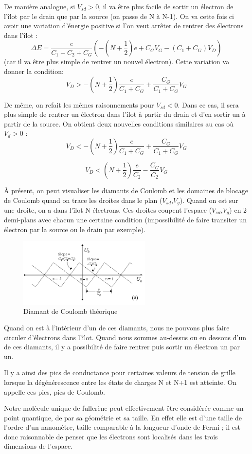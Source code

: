 De manière analogue, si $V_{sd}>0$, il va être plus facile de sortir un électron de l'îlot par le drain que par la source (on passe de N à N-1). On va cette fois ci avoir une variation d'énergie positive si l'on veut arrêter de rentrer des électrons dans l'îlot :
\[\Delta E = \frac{e}{C_1 + C_2 + C_G}\left(-(N + \frac{1}{2})e + C_G V_G - (C_1 + C_G) V_D\right)\]
(car il va être plus simple de rentrer un nouvel électron). Cette variation va donner la condition:
\[V_D > - (N + \frac{1}{2})\frac{e}{C_1 + C_G} + \frac{C_G}{C_1 + C_G}V_G\]

De même, on refait les mêmes raisonnements pour $V_{sd}<0$. Dans ce cas, il sera plus simple de rentrer un électron dans l'îlot à partir du drain et d'en sortir un à partir de la source. On obtient deux nouvelles conditions similaires au cas où  $V_{d}>0$ :
\[V_D < - (N + \frac{1}{2})\frac{e}{C_1 + C_G} + \frac{C_G}{C_1 + C_G}V_G\]

\[V_D < (N + \frac{1}{2})\frac{e}{C_2} - \frac{C_G}{C_2}V_G\]

À présent, on peut visualiser les diamants de Coulomb et les domaines de blocage de Coulomb quand on trace les droites dans le plan ($V_{sd}$,$V_{g}$). Quand on est sur une droite, on a dans l'îlot N électrons. Ces droites coupent l'espace ($V_{sd}$,$V_{g}$) en 2 demi-plans avec chacun une certaine condition (impossibilité de faire transiter un électron par la source ou le drain par exemple).
\begin{figure}[h]
    \begin{center}
        \includegraphics[width=250px]{Images/Diamant_Coulomb_Theorie.png}
        \caption{Diamant de Coulomb théorique}
        \label{fig:}
    \end{center}
\end{figure}

Quand on est à l'intérieur d'un de ces diamants, nous ne pouvons plus faire circuler d'électrons dans l'îlot. Quand nous sommes au-dessus ou en dessous d'un de ces diamants, il y a possibilité de faire rentrer puis sortir un électron un par un.

Il y a ainsi des pics de conductance pour certaines valeurs de tension de grille lorsque la dégénérescence entre les états de charges N et N+1 est atteinte. On appelle ces pics, pics de Coulomb.

Notre molécule unique de fullerène peut effectivement être considérée comme un point quantique, de par sa géométrie et sa taille. En effet elle est d'une taille de l'ordre d'un nanomètre, taille comparable à la longueur d'onde de Fermi ; il est donc raisonnable de penser que les électrons sont localisés dans les trois dimensions de l'espace.

